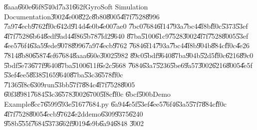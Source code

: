 \bigskip

\U{8aaa}\U{660e}\U{66f8}\U{540d}\U{7a31}\U{662f}GyroSoft Simulation
Documentation\U{3002}\U{4e00}\U{822c}\U{8b80}\U{8005}\U{4f7f}\U{7528}\U{8996}%
\U{7a97}\U{4ecb}\U{9762}\U{ff0c}\U{642d}\U{914d}\U{4e0b}\U{4e00}\U{7ae0}%
\U{7bc0}\U{7684}\U{6f14}\U{793a}\U{7bc4}\U{4f8b}\U{ff0c}\U{5373}\U{53ef}%
\U{4f7f}\U{7528}\U{6b64}\U{8edf}\U{9ad4}\U{4f86}\U{5b78}\U{7fd2}\U{9640}%
\U{87ba}\U{5100}\U{61c9}\U{7528}\U{3002}\U{4f7f}\U{7528}\U{8005}\U{53ef}%
\U{4ee5}\U{76f4}\U{63a5}\U{9ede}\U{9078}\U{8996}\U{7a97}\U{4ecb}\U{9762}%
\U{7684}\U{6f14}\U{793a}\U{7bc4}\U{4f8b}\U{904b}\U{884c}\U{ff0c}\U{4e26}%
\U{7814}\U{8b80}\U{6587}\U{4ef6}\U{7684}\U{8aaa}\U{660e}\U{3002}\U{5982}%
\U{89c0}\U{5bdf}\U{9640}\U{87ba}\U{904b}\U{52d5}\U{ff0c}\U{6216}\U{89c0}%
\U{5bdf}\U{5e73}\U{677f}\U{9640}\U{87ba}\U{5100}\U{611f}\U{6e2c}\U{5668}%
\U{7684}\U{63a7}\U{5236}\U{5be6}\U{9a57}\U{3002}\U{6216}\U{8005}\U{4e5f}%
\U{53ef}\U{4ee5}\U{8f38}\U{5165}\U{9640}\U{87ba}\U{53c3}\U{6578}\U{ff0c}%
\U{7136}\U{5f8c}\U{6309}run\U{53bb}\U{57f7}\U{884c}\U{4f7f}\U{7528}\U{8005}%
\U{60f3}\U{8981}\U{7684}\U{53c3}\U{6578}\U{3002}\U{6700}\U{5f8c}\U{ff0c}%
\U{6bcf}\U{500b}Demo Example\U{8cc7}\U{6599}\U{593e}\U{5167}\U{7684}.py%
\U{6a94}\U{4e5f}\U{53ef}\U{4ee5}\U{76f4}\U{63a5}\U{57f7}\U{884c}\U{ff0c}%
\U{4f7f}\U{7528}\U{8005}\U{4ecb}\U{9762}\U{4e2d}demo\U{6309}\U{9375}\U{6240}%
\U{958b}\U{555f}\U{7684}\U{5373}\U{662f}\U{9019}\U{4e9b}\U{6a94}\U{6848}%
\U{3002}


